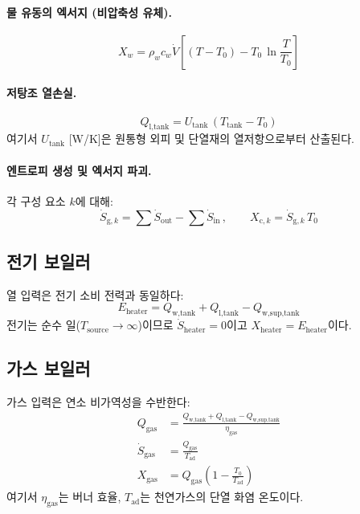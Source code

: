 \paragraph{물 유동의 엑서지 (비압축성 유체).}
\begin{equation}\label{eq:dhw-X}
  X_w = \rho_w c_w \dot{V}\left[(T - T_0) - T_0\,\ln\frac{T}{T_0}\right]
\end{equation}

\paragraph{저탕조 열손실.}
\begin{equation}\label{eq:dhw-Ql}
  Q_\text{l,tank} = U_\text{tank}\,(T_\text{tank} - T_0)
\end{equation}
여기서 $U_\text{tank}$ [W/K]은 원통형 외피 및 단열재의 열저항으로부터 산출된다.

\paragraph{엔트로피 생성 및 엑서지 파괴.}
각 구성 요소 $k$에 대해:
\begin{equation}\label{eq:dhw-Sg}
  \dot{S}_{\text{g},k} = \sum \dot{S}_\text{out} - \sum \dot{S}_\text{in}
  \,,\qquad
  X_{\text{c},k} = \dot{S}_{\text{g},k}\,T_0
\end{equation}

\subsection{전기 보일러}

열 입력은 전기 소비 전력과 동일하다:
\begin{equation}\label{eq:eb-energy}
  E_\text{heater} = Q_\text{w,tank} + Q_\text{l,tank} - Q_\text{w,sup,tank}
\end{equation}
전기는 순수 일($T_\text{source} \to \infty$)이므로 $\dot{S}_\text{heater} = 0$이고 $X_\text{heater} = E_\text{heater}$이다.

\subsection{가스 보일러}

가스 입력은 연소 비가역성을 수반한다:
\begin{align}
  Q_\text{gas} &= \frac{Q_\text{w,tank} + Q_\text{l,tank} - Q_\text{w,sup,tank}}{\eta_\text{gas}} \label{eq:gb-Qgas} \\
  \dot{S}_\text{gas} &= \frac{Q_\text{gas}}{T_\text{ad}} \label{eq:gb-Sgas} \\
  X_\text{gas} &= Q_\text{gas}\left(1 - \frac{T_0}{T_\text{ad}}\right) \label{eq:gb-Xgas}
\end{align}
여기서 $\eta_\text{gas}$는 버너 효율, $T_\text{ad}$는 천연가스의 단열 화염 온도이다.


